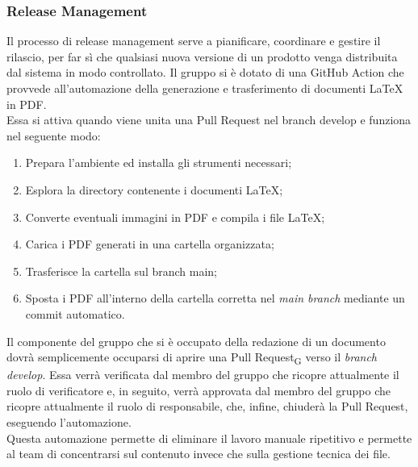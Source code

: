 \subsubsection{Release Management}
Il processo di release management serve a pianificare, coordinare e gestire il rilascio, per far sì che qualsiasi nuova versione di un prodotto venga distribuita dal sistema in modo controllato.
Il gruppo si è dotato di una GitHub Action che provvede all'automazione della generazione e trasferimento di documenti LaTeX in PDF.\\
Essa si attiva quando viene unita una Pull Request nel branch develop e funziona nel seguente modo: 
\begin{enumerate}
    \item Prepara l'ambiente ed installa gli strumenti necessari;
    \item Esplora la directory contenente i documenti LaTeX;
    \item Converte eventuali immagini in PDF e compila i file LaTeX;
    \item Carica i PDF generati in una cartella organizzata;
    \item Trasferisce la cartella sul branch main;
    \item Sposta i PDF all'interno della cartella corretta nel \textit{main branch} mediante un commit automatico.
\end{enumerate}
Il componente del gruppo che si è occupato della redazione di un documento dovrà semplicemente occuparsi di aprire una Pull Request\textsubscript{G} verso il \textit{branch develop}. Essa verrà verificata dal membro del gruppo che ricopre attualmente il ruolo di verificatore e, in seguito, verrà approvata dal membro del gruppo che ricopre attualmente il ruolo di responsabile, che, infine, chiuderà la Pull Request, eseguendo l'automazione.\\
Questa automazione permette di eliminare il lavoro manuale ripetitivo e permette al team di concentrarsi sul contenuto invece che sulla gestione tecnica dei file.